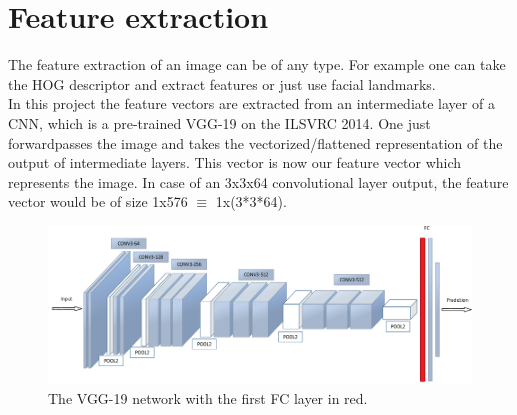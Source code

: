 \documentclass[
     11pt,         %
     a4paper,      %
     oneside,
     ]{article}
\begin{document}
\section{Feature extraction}
The feature extraction of an image can be of any type. For example one can take the HOG descriptor and extract features or just use facial landmarks.\\
In this project the feature vectors are extracted from an intermediate layer of a CNN, which is a pre-trained VGG-19 on the ILSVRC 2014.
One just forwardpasses the image and takes the vectorized/flattened representation of the output of intermediate layers.
This vector is now our feature vector which represents the image. In case of an 3x3x64 convolutional layer output, the feature vector would be of size 1x576 $\equiv$ 1x(3*3*64).\\
\begin{figure}[H]
  \begin{center}
    \includegraphics[width=1.0\textwidth]{images/VGG19.png}
    \caption{The VGG-19 network with the first FC layer in red.}
    \label{fig:VGG19}
  \end{center}
\end{figure}
\end{document}
